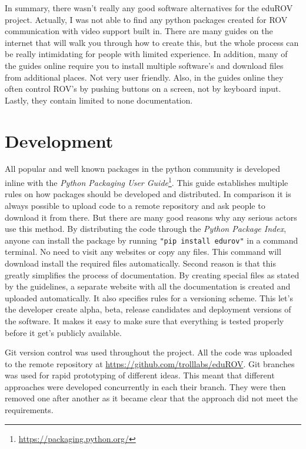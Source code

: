 In summary, there wasn't really any good software alternatives for the eduROV project. Actually, I was not able to find any python packages created for ROV communication with video support built in. There are many guides on the internet that will walk you through how to create this, but the whole process can be really intimidating for people with limited experience. In addition, many of the guides online require you to install multiple software's and download files from additional places. Not very user friendly. Also, in the guides online they often control ROV's by pushing buttons on a screen, not by keyboard input. Lastly, they contain limited to none documentation.

\section{Development}

All popular and well known packages in the python community is developed inline with the \emph{Python Packaging User Guide}\footnote{\url{https://packaging.python.org/}}. This guide establishes multiple rules on how packages should be developed and distributed. In comparison it is always possible to upload code to a remote repository and ask people to download it from there. But there are many good reasons why any serious actors use this method. By distributing the code through the \emph{Python Package Index}, anyone can install the package by running \texttt{"pip install edurov"} in a command terminal. No need to visit any websites or copy any files. This command will download install the required files automatically. Second reason is that this greatly simplifies the process of documentation. By creating special files as stated by the guidelines, a separate website with all the documentation is created and uploaded automatically. It also specifies rules for a versioning scheme. This let's the developer create alpha, beta, release candidates and deployment versions of the software. It makes it easy to make sure that everything is tested properly before it get's publicly available.

Git version control was used throughout the project. All the code was uploaded to the remote repository at \url{https://github.com/trolllabs/eduROV}. Git branches was used for rapid prototyping of different ideas. This meant that different approaches were developed concurrently in each their branch. They were then removed one after another as it became clear that the approach did not meet the requirements.

